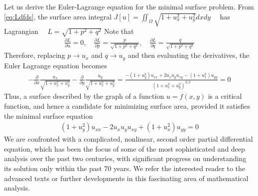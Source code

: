 \documentclass{article}
\begin{document}
\begin{exma}
 Let us derive the Euler-Lagrange equation for the minimal surface problem. From \cref{eq:Ldfds}, the surface area integral
$J[u]=\iint_{\Omega} \sqrt{1+u_{x}^{2}+u_{y}^{2}} d x d y \quad$ has Lagrangian $\quad L=\sqrt{1+p^{2}+q^{2}}$
Note that
\begin{align*}
\frac{\partial L}{\partial u}=0, \quad \frac{\partial L}{\partial p}=\frac{p}{\sqrt{1+p^{2}+q^{2}}}, \quad \frac{\partial L}{\partial q}=\frac{q}{\sqrt{1+p^{2}+q^{2}}}
\end{align*}
Therefore, replacing $p \rightarrow u_{x}$ and $q \rightarrow u_{y}$ and then evaluating the derivatives, the Euler Lagrange equation  becomes
\begin{align*}
-\frac{\partial}{\partial x} \frac{u_{x}}{\sqrt{1+u_{x}^{2}+u_{y}^{2}}}-\frac{\partial}{\partial y} \frac{u_{y}}{\sqrt{1+u_{x}^{2}+u_{y}^{2}}}=\frac{-\left(1+u_{y}^{2}\right) u_{x x}+2 u_{x} u_{y} u_{x y}-\left(1+u_{x}^{2}\right) u_{y y}}{\left(1+u_{x}^{2}+u_{y}^{2}\right)^{3 / 2}}=0
\end{align*}
Thus, a surface described by the graph of a function $u=f(x, y)$ is a critical function, and hence a candidate for minimizing surface area, provided it satisfies the minimal surface equation
\begin{align*}
\left(1+u_{y}^{2}\right) u_{x x}-2 u_{x} u_{y} u_{x y}+\left(1+u_{x}^{2}\right) u_{y y}=0
\end{align*}
We are confronted with a complicated, nonlinear, second order partial differential equation, which has been the focus of some of the most sophisticated and deep analysis over the past two centuries, with significant progress on understanding its solution only within the past 70 years. We refer the interested reader to the advanced texts or further developments in this fascinating area of mathematical analysis.
\end{exma}
\end{document}
